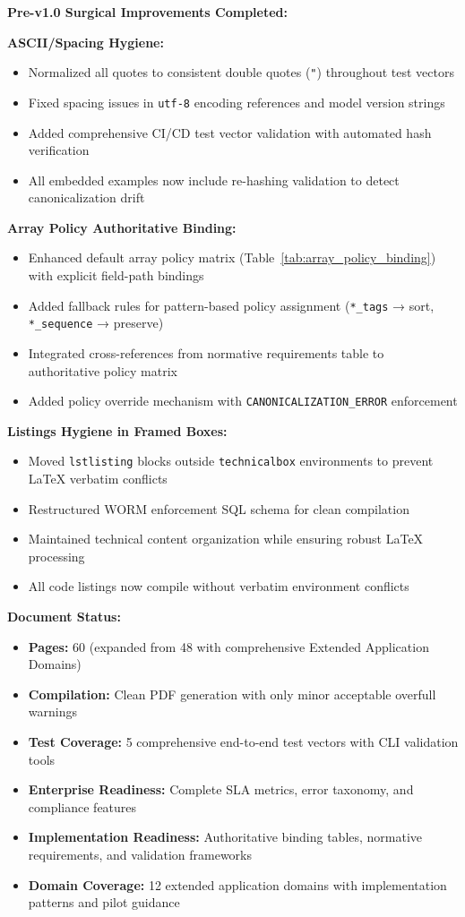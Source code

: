 \documentclass[12pt,a4paper]{article}
\begin{document}
\begin{technicalbox}
\textbf{Pre-v1.0 Surgical Improvements Completed:}

\textbf{ASCII/Spacing Hygiene:}
\begin{itemize}
\item Normalized all quotes to consistent double quotes (\texttt{"}) throughout test vectors
\item Fixed spacing issues in \texttt{utf-8} encoding references and model version strings
\item Added comprehensive CI/CD test vector validation with automated hash verification
\item All embedded examples now include re-hashing validation to detect canonicalization drift
\end{itemize}

\textbf{Array Policy Authoritative Binding:}
\begin{itemize}
\item Enhanced default array policy matrix (Table~\ref{tab:array_policy_binding}) with explicit field-path bindings
\item Added fallback rules for pattern-based policy assignment (\texttt{*\_tags} → sort, \texttt{*\_sequence} → preserve)
\item Integrated cross-references from normative requirements table to authoritative policy matrix
\item Added policy override mechanism with \texttt{CANONICALIZATION\_ERROR} enforcement
\end{itemize}

\textbf{Listings Hygiene in Framed Boxes:}
\begin{itemize}
\item Moved \texttt{lstlisting} blocks outside \texttt{technicalbox} environments to prevent LaTeX verbatim conflicts
\item Restructured WORM enforcement SQL schema for clean compilation
\item Maintained technical content organization while ensuring robust LaTeX processing
\item All code listings now compile without verbatim environment conflicts
\end{itemize}

\textbf{Document Status:}
\begin{itemize}
\item \textbf{Pages:} 60 (expanded from 48 with comprehensive Extended Application Domains)
\item \textbf{Compilation:} Clean PDF generation with only minor acceptable overfull warnings
\item \textbf{Test Coverage:} 5 comprehensive end-to-end test vectors with CLI validation tools
\item \textbf{Enterprise Readiness:} Complete SLA metrics, error taxonomy, and compliance features
\item \textbf{Implementation Readiness:} Authoritative binding tables, normative requirements, and validation frameworks
\item \textbf{Domain Coverage:} 12 extended application domains with implementation patterns and pilot guidance
\end{itemize}


\end{technicalbox}
\end{document}
